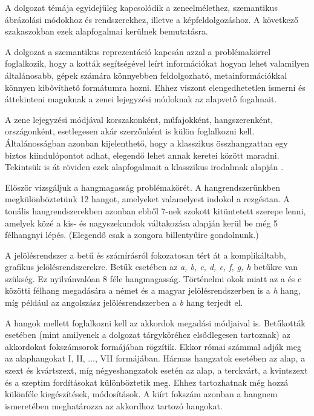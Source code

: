 
A dolgozat témája egyidejűleg kapcsolódik a zeneelmélethez, szemantikus ábrázolási módokhoz és rendszerekhez, illetve a képfeldolgozáshoz. A következő szakaszokban ezek alapfogalmai kerülnek bemutatásra.


A dolgozat a szemantikus reprezentáció kapcsán azzal a problémakörrel foglalkozik, hogy a kották segítségével leírt információkat hogyan lehet valamilyen általánosabb, gépek számára könnyebben feldolgozható, metainformációkkal könnyen kibővíthető formátumra hozni. Ehhez viszont elengedhetetlen ismerni és áttekinteni maguknak a zenei lejegyzési módoknak az alapvető fogalmait.

A zene lejegyzési módjával korszakonként, műfajokként, hangszerenként, országonként, esetlegesen akár szerzőnként is külön foglalkozni kell. Általánosságban azonban kijelenthető, hogy a klasszikus összhangzattan egy biztos kiindulópontot adhat, elegendő lehet annak keretei között maradni. Tekintsük is át röviden ezek alapfogalmait a klasszikus irodalmak alapján \cite{kesztler1952,frank1997}.

Először vizsgáljuk a hangmagasság problémakörét.
A hangrendszerünkben megkülönböztetünk 12 hangot, amelyeket valamelyest indokol a rezgéstan. A tonális hangrendszerekben azonban ebből 7-nek szokott kitüntetett szerepe lenni, amelyek közé a kis- és nagyszekundok váltakozása alapján kerül be még 5 félhangnyi lépés. (Elegendő csak a zongora billentyűire gondolnunk.)

A jelölésrendszer a betű és számírásról fokozatosan tért át a komplikáltabb, grafikus jelölésrendszerekre. Betűk esetében az \textit{a, b, c, d, e, f, g, h} betűkre van szükség. Ez nyilvánvalóan 8 féle hangmagasság. Történelmi okok miatt az a és c közötti félhang megadására a német és a magyar jelölésrendszerben is a \textit{h} hang, míg például az angolszász jelölésrendszerben a \textit{b} hang terjedt el.

A hangok mellett foglalkozni kell az akkordok megadási módjaival is. Betűkották esetében (mint amilyenek a dolgozat tárgyköréhez elsődlegesen tartoznak) az akkordokat fokszámsorok formájában rögzítik. Ekkor római számmal adják meg az alaphangokat I, II, $\ldots$, VII formájában. Hármas hangzatok esetében az alap, a szext és kvártszext, míg négyeshangzatok esetén az alap, a terckvárt, a kvintszext és a szeptim fordításokat különböztetik meg. Ehhez tartozhatnak még hozzá különféle kiegészítések, módosítások. A kiírt fokszám azonban a hangnem ismeretében meghatározza az akkordhoz tartozó hangokat.

